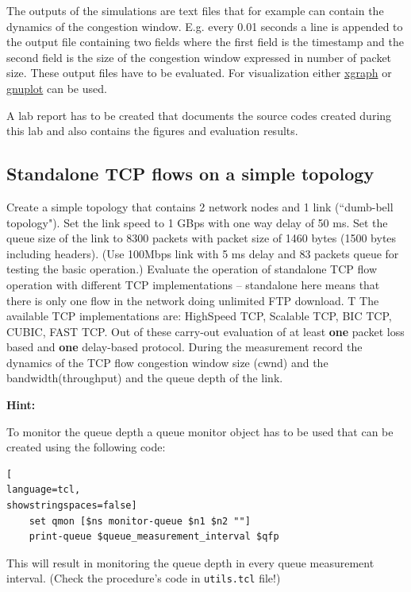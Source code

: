 \documentclass[a4paper]{article}
\begin{document}
The outputs of the simulations are text files that for example can contain the dynamics of
the congestion window. E.g. every 0.01 seconds a line is appended to the output file containing
two fields where the first field is the timestamp and the second field is the size of the congestion
window expressed in number of packet size. These output files have to be evaluated. For visualization either
\href{http://www.xgraph.org/}{xgraph}
or \href{http://www.gnuplot.info/}{gnuplot} can be used.

A lab report has to be created that documents the source codes created during this lab and also contains the
figures and evaluation results.

\subsection{Standalone TCP flows on a simple topology}

Create a simple topology that contains 2 network nodes and 1 link (``dumb-bell topology").
Set the link speed to 1 GBps with one way delay of 50 ms. Set the queue size of the link to 8300 packets with packet
size of 1460 bytes (1500 bytes including headers).
(Use 100Mbps link with 5 ms delay and  83 packets queue for testing the basic operation.)
Evaluate the operation of standalone TCP flow operation with different TCP implementations -- standalone here means
that there is only one flow in the network
doing unlimited FTP download. T
The available TCP implementations are: HighSpeed TCP, Scalable TCP, BIC TCP, CUBIC, FAST TCP. Out of these carry-out
evaluation of at least \textbf{one} packet loss based and \textbf{one} delay-based protocol.
During the measurement record the dynamics of the TCP flow congestion window size (cwnd) and the bandwidth(throughput)
and
the queue depth of the link.

\textbf{Hint:} \hfill \break

To monitor the queue depth a queue monitor object has to be used that can be created using the following code:

\begin{lstlisting}[
language=tcl,
showstringspaces=false]
    set qmon [$ns monitor-queue $n1 $n2 ""]
    print-queue $queue_measurement_interval $qfp
\end{lstlisting}

This will result in monitoring the queue depth in every queue measurement interval. (Check the procedure's code in
\verb!utils.tcl! file!)
\end{document}
